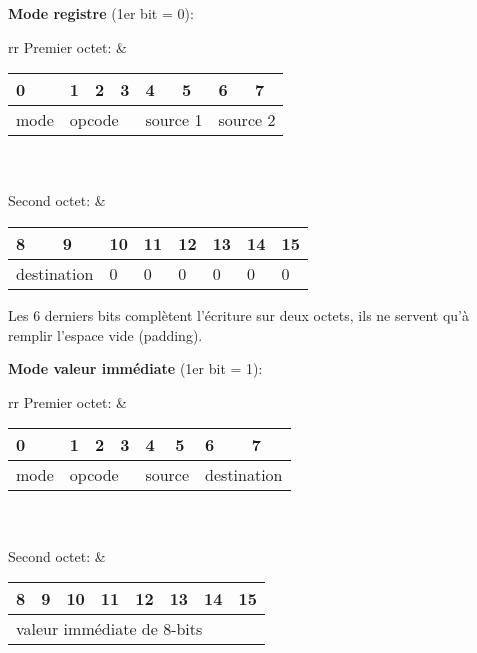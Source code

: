 \documentclass[a4paper]{article}
\newcommand{\bluecell}{\cellcolor{blue!25}}
\begin{document}
\textbf{Mode registre} (1er bit = 0):
\begin{center}
\begin{tabular}{rr}
    Premier octet: &
    \begin{tabular}{|p{1cm}|p{1cm}|p{1cm}|p{1cm}|p{1cm}|p{1cm}|p{1cm}|p{1cm}|} \hline
        0 & 1 & 2 & 3 & 4 & 5 & 6 & 7 \\ \hline
        mode & \multicolumn{3}{l|}{opcode} & \multicolumn{2}{l|}{source 1} & \multicolumn{2}{l|}{source 2} \\ \hline
    \end{tabular}
    \\ \\
    Second octet: &
    \begin{tabular}{|p{1cm}|p{1cm}|p{1cm}|p{1cm}|p{1cm}|p{1cm}|p{1cm}|p{1cm}|} \hline
        8 & 9 & 10 & 11 & 12 & 13 & 14 & 15 \\ \hline
        \multicolumn{2}{|l|}{destination} & \bluecell 0 & \bluecell 0 & \bluecell 0 & \bluecell 0 & \bluecell 0 & \bluecell 0 \\ \hline
    \end{tabular}
\end{tabular}
\end{center}

Les 6 derniers bits complètent l’écriture sur deux octets, ils ne servent qu’à remplir l’espace vide (padding).

\textbf{Mode valeur immédiate} (1er bit = 1):
\begin{center}
\begin{tabular}{rr}
    Premier octet: &
    \begin{tabular}{|p{1cm}|p{1cm}|p{1cm}|p{1cm}|p{1cm}|p{1cm}|p{1cm}|p{1cm}|} \hline
        0 & 1 & 2 & 3 & 4 & 5 & 6 & 7 \\ \hline
        mode & \multicolumn{3}{l|}{opcode} & \multicolumn{2}{l|}{source} & \multicolumn{2}{l|}{destination} \\ \hline
    \end{tabular}
    \\ \\
    Second octet: &
    \begin{tabular}{|p{1cm}|p{1cm}|p{1cm}|p{1cm}|p{1cm}|p{1cm}|p{1cm}|p{1cm}|} \hline
        8 & 9 & 10 & 11 & 12 & 13 & 14 & 15 \\ \hline
        \multicolumn{8}{|l|}{valeur immédiate de 8-bits} \\ \hline
    \end{tabular}
\end{tabular}
\end{center}
\end{document}
